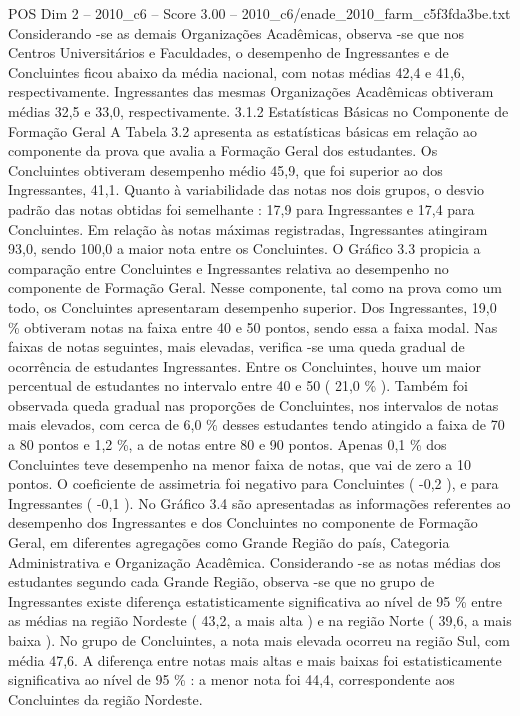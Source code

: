 \begin{textsample}{POS Dim 2 – 2010\_c6 – Score 3.00 – 2010\_c6/enade\_2010\_farm\_c5f3fda3be.txt}
Considerando -se as demais Organizações Acadêmicas, observa -se que nos Centros Universitários e Faculdades, o desempenho de Ingressantes e de Concluintes ficou abaixo da média nacional, com notas médias 42,4 e 41,6, respectivamente.
Ingressantes das mesmas Organizações Acadêmicas obtiveram médias 32,5 e 33,0, respectivamente. 3.1.2 Estatísticas Básicas no Componente de Formação Geral A Tabela 3.2 apresenta as estatísticas básicas em relação ao componente da prova que avalia a Formação Geral dos estudantes.
Os Concluintes obtiveram desempenho médio 45,9, que foi superior ao dos Ingressantes, 41,1.
Quanto à variabilidade das notas nos dois grupos, o desvio padrão das notas obtidas foi semelhante : 17,9 para Ingressantes e 17,4 para Concluintes.
Em relação às notas máximas registradas, Ingressantes atingiram 93,0, sendo 100,0 a maior nota entre os Concluintes.
O Gráfico 3.3 propicia a comparação entre Concluintes e Ingressantes relativa ao desempenho no componente de Formação Geral.
Nesse componente, tal como na prova como um todo, os Concluintes apresentaram desempenho superior.
Dos Ingressantes, 19,0 \% obtiveram notas na faixa entre 40 e 50 pontos, sendo essa a faixa modal.
Nas faixas de notas seguintes, mais elevadas, verifica -se uma queda gradual de ocorrência de estudantes Ingressantes.
Entre os Concluintes, houve um maior percentual de estudantes no intervalo entre 40 e 50 ( 21,0 \% ).
Também foi observada queda gradual nas proporções de Concluintes, nos intervalos de notas mais elevados, com cerca de 6,0 \% desses estudantes tendo atingido a faixa de 70 a 80 pontos e 1,2 \%, a de notas entre 80 e 90 pontos.
Apenas 0,1 \% dos Concluintes teve desempenho na menor faixa de notas, que vai de zero a 10 pontos.
O coeficiente de assimetria foi negativo para Concluintes ( -0,2 ), e para Ingressantes ( -0,1 ).
No Gráfico 3.4 são apresentadas as informações referentes ao desempenho dos Ingressantes e dos Concluintes no componente de Formação Geral, em diferentes agregações como Grande Região do país, Categoria Administrativa e Organização Acadêmica.
Considerando -se as notas médias dos estudantes segundo cada Grande Região, observa -se que no grupo de Ingressantes existe diferença estatisticamente significativa ao nível de 95 \% entre as médias na região Nordeste ( 43,2, a mais alta ) e na região Norte ( 39,6, a mais baixa ).
No grupo de Concluintes, a nota mais elevada ocorreu na região Sul, com média 47,6.
A diferença entre notas mais altas e mais baixas foi estatisticamente significativa ao nível de 95 \% : a menor nota foi 44,4, correspondente aos Concluintes da região Nordeste.

\end{textsample}
